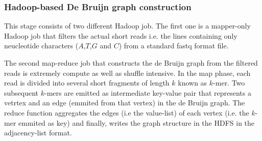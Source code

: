 \documentclass[conference]{IEEEtran}
\begin{document}
\subsubsection {Hadoop-based De Bruijn graph construction}
This stage consists of two different Hadoop job.
The first one is a mapper-only Hadoop job that filters the actual short reads i.e. the lines containing only neucleotide characters ($A$,$T$,$G$ and $C$) from a standard fastq format file.

The second map-reduce job that constructs the de Bruijn graph from the filtered reads is extremely compute as well as shuffle intensive.
In the map phase, each read is divided into several short fragments of length $k$ known as $k$-mer. 
Two subsequent $k$-mers are emitted as intermediate key-value pair that represents  a vetrtex and an edge (emmited from that vertex) in the de Bruijn graph.  
The reduce function aggregates the edges (i.e the value-list) of each vertex (i.e. the $k$-mer emmited as key) and finally, writes the graph structure in the HDFS in the adjacency-list format.
\end{document}
